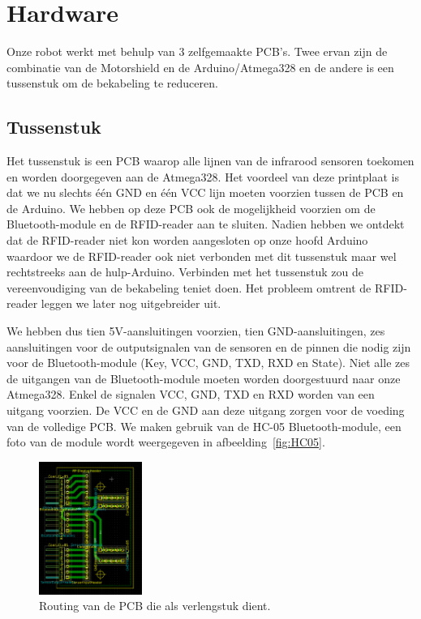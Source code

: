 \chapter{Hardware}
Onze robot werkt met behulp van 3 zelfgemaakte PCB's. Twee ervan zijn de combinatie van de Motorshield en de Arduino/Atmega328 en de andere is een tussenstuk om de bekabeling te reduceren.





\section{Tussenstuk}
Het tussenstuk is een PCB waarop alle lijnen van de infrarood sensoren toekomen en worden doorgegeven aan de Atmega328. Het voordeel van deze printplaat is dat we nu slechts \'e\'en GND en \'e\'en VCC lijn moeten voorzien tussen de PCB en de Arduino. We hebben op deze PCB ook de mogelijkheid voorzien om de Bluetooth-module en de RFID-reader aan te sluiten. Nadien hebben we ontdekt dat de RFID-reader niet kon worden aangesloten op onze hoofd Arduino waardoor we de RFID-reader ook niet verbonden met dit tussenstuk maar wel rechtstreeks aan de hulp-Arduino. Verbinden met het tussenstuk zou de vereenvoudiging van de bekabeling teniet doen. Het probleem omtrent de RFID-reader leggen we later nog uitgebreider uit. 






We hebben dus tien 5V-aansluitingen voorzien, tien GND-aansluitingen, zes aansluitingen voor de outputsignalen van de sensoren en de pinnen die nodig zijn voor de Bluetooth-module (Key, VCC, GND, TXD, RXD en State). Niet alle zes de uitgangen van de Bluetooth-module moeten worden doorgestuurd naar onze Atmega328. Enkel de signalen VCC, GND, TXD en RXD worden van een uitgang voorzien.  De VCC en de GND aan deze uitgang zorgen voor de voeding van de volledige PCB. We maken gebruik van de HC-05 Bluetooth-module, een foto van de module wordt weergegeven in afbeelding~\ref{fig:HC05}.
\newpage
\begin{figure}[h]
\centering
\includegraphics[width=0.3\textwidth]{tussenstukPCB.png}
\caption{Routing van de PCB die als verlengstuk dient. \label{tussenstukPCB}}
\end{figure}


